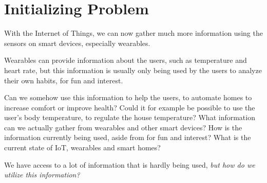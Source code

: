 \section{Initializing Problem}
With the Internet of Things, 
we can now gather much more information using the sensors on smart devices, especially wearables. 

Wearables can provide information about the users,
such as temperature and heart rate, 
but this information is usually only being used by the users to analyze their own habits, 
for fun and interest. 

Can we somehow use this information to help the users, 
to automate homes to increase comfort or improve health?
Could it for example be possible to use the user's body temperature, 
to regulate the house temperature?
What information can we actually gather from wearables and other smart devices? 
How is the information currently being used, 
aside from for fun and interest? 
What is the current state of IoT, wearables and smart homes? 

We have access to a lot of information that is hardly being used,
\emph{but how do we utilize this information?}
